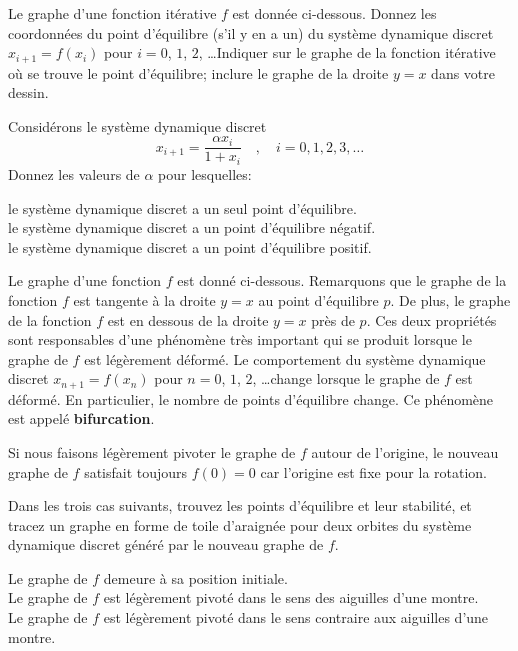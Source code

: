 \begin{question}[\life]
Le graphe d'une fonction itérative $f$ est donnée ci-dessous.
Donnez les coordonnées du point d'équilibre (s'il y en a un) du système
dynamique discret $x_{i+1} = f(x_i)$ pour $i=0$, $1$, $2$, \ldots  Indiquer
sur le graphe de la fonction itérative où se trouve le point d'équilibre;
inclure le graphe de la droite $y=x$ dans votre dessin.
\label{6Q98}
\end{question}

\begin{question}[\life]
Considérons le système dynamique discret
\[
x_{i+1} = \frac{\alpha x_i}{1+x_i} \quad , \quad i=0, 1, 2, 3, \ldots
\]
Donnez les valeurs de $\alpha$ pour lesquelles:

 le système dynamique discret a un seul point d'équilibre.\\
 le système dynamique discret a un point d'équilibre
négatif.\\
 le système dynamique discret a un point d'équilibre positif.
\label{6Q99}
\end{question}

\begin{question}[\life \theory]
Le graphe d'une fonction $f$ est donné ci-dessous.
Remarquons que le graphe de la fonction $f$ est tangente à la droite
$y=x$ au point d'équilibre $p$.  De plus, le graphe de la fonction $f$
est en dessous de la droite $y=x$ près de $p$.  Ces deux propriétés
sont responsables d'une phénomène très important qui se produit
lorsque le graphe de $f$ est légèrement déformé.  Le comportement du
système dynamique discret $x_{n+1} = f(x_n)$ pour $n=0$, $1$, $2$,
\ldots change lorsque le graphe de $f$ est déformé.  En particulier,
le nombre de points d'équilibre change.  Ce phénomène est appelé
{\bfseries bifurcation}.

Si nous faisons légèrement pivoter le graphe de $f$ autour de l'origine, le
nouveau graphe de $f$ satisfait toujours $f(0)=0$ car l'origine est fixe pour
la rotation.

Dans les trois cas suivants, trouvez les points d'équilibre et leur
stabilité, et tracez un graphe en forme de toile d'araignée pour deux
orbites du système dynamique discret généré par le nouveau graphe de $f$.

 Le graphe de $f$ demeure à sa position initiale.\\
 Le graphe de $f$ est légèrement pivoté dans le sens des aiguilles
d'une montre.\\
 Le graphe de $f$ est légèrement pivoté dans le sens contraire aux
aiguilles d'une montre.
\label{6Q100}
\end{question}

